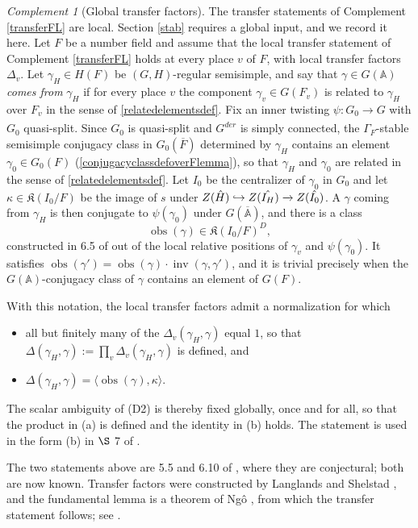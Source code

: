 \documentclass[11pt,a4paper]{article}
\DeclareMathOperator{\inv}{inv}
\DeclareMathOperator{\obs}{obs}
\theoremstyle{definition}
\theoremstyle{plain}
\theoremstyle{remark}
\newtheorem{Rc}[shared]{Complement}
\theoremstyle{plain}
\begin{document}
\begin{Rc}[Global transfer factors]\label{globaltransfer}
    The transfer statements of Complement \ref{transferFL} are local. Section \ref{stab} requires a global input, and we record it here. Let $F$ be a number field and assume that the local transfer statement of Complement \ref{transferFL} holds at every place $v$ of $F$, with local transfer factors $\Delta_v$. Let $\gamma_H \in H(F)$ be $(G,H)$-regular semisimple, and say that $\gamma \in G(\mathbb{A})$ \textit{comes from} $\gamma_H$ if for every place $v$ the component $\gamma_v \in G(F_v)$ is related to $\gamma_H$ over $F_v$ in the sense of \ref{relatedelementsdef}. Fix an inner twisting $\psi : G_0 \xrightarrow[]{} G$ with $G_0$ quasi-split. Since $G_0$ is quasi-split and $G^{der}$ is simply connected, the $\Gamma_F$-stable semisimple conjugacy class in $G_0(\overline{F})$ determined by $\gamma_H$ contains an element $\gamma_0 \in G_0(F)$ (\ref{conjugacyclassdefoverFlemma}), so that $\gamma_H$ and $\gamma_0$ are related in the sense of \ref{relatedelementsdef}. Let $I_0$ be the centralizer of $\gamma_0$ in $G_0$ and let $\kappa \in \mathfrak{K}(I_0/F)$ be the image of $s$ under $Z(\Hat{H}) \hookrightarrow Z(\Hat{I_H}) \xrightarrow[]{} Z(\Hat{I_0})$. A $\gamma$ coming from $\gamma_H$ is then conjugate to $\psi(\gamma_0)$ under $G(\overline{\mathbb{A}})$, and there is a class
    $$\obs(\gamma) \in \mathfrak{K}(I_0/F)^D,$$
    constructed in 6.5 of \cite{MR858284} out of the local relative positions of $\gamma_v$ and $\psi(\gamma_0)$. It satisfies $\obs(\gamma') = \obs(\gamma) \cdot \inv(\gamma,\gamma')$, and it is trivial precisely when the $G(\mathbb{A})$-conjugacy class of $\gamma$ contains an element of $G(F)$.

    With this notation, the local transfer factors admit a normalization for which
    \begin{itemize}
        \item[(a)] all but finitely many of the $\Delta_v(\gamma_H, \gamma)$ equal $1$, so that $\Delta(\gamma_H,\gamma) := \prod_v \Delta_v(\gamma_H,\gamma)$ is defined, and
        \item[(b)] $\Delta(\gamma_H, \gamma) = \langle \obs(\gamma), \kappa \rangle$.
    \end{itemize}
    The scalar ambiguity of (D2) is thereby fixed globally, once and for all, so that the product in (a) is defined and the identity in (b) holds. The statement is used in the form (b) in $\S$ 7 of \cite{MR1044820}.

    The two statements above are 5.5 and 6.10 of \cite{MR858284}, where they are conjectural; both are now known. Transfer factors were constructed by Langlands and Shelstad \cite{MR909227}, and the fundamental lemma is a theorem of Ng\^o \cite{MR2653248}, from which the transfer statement follows; see \cite{MR3051198}.
\end{Rc}
\end{document}
